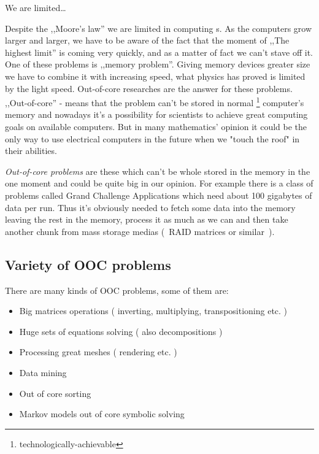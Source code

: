 We are limited\ldots

Despite the ,,Moore's law'' we are limited in computing s.
As the computers grow larger and larger, we have to be aware of the fact that the moment of ,,The highest limit'' is coming very quickly, and as a matter of fact we can't stave off it.
One of these problems is ,,memory problem''.
Giving memory devices greater size we have to combine it with increasing speed, what physics has proved is limited by the light speed.
Out-of-core researches are the answer for these problems. ,,Out-of-core'' - means that the problem can't be stored in normal \footnote{technologically-achievable} computer's memory and nowadays it's a possibility for scientists to achieve great computing goals on available computers.
But in many mathematics' opinion it could be the only way to use electrical computers in the future when we "touch the roof" in their abilities.

\emph{Out-of-core problems} are these which can't be whole stored in the memory in the one moment and could be quite big in our opinion.
For example there is a class of problems called Grand Challenge Applications which need about 100 gigabytes of data per run.\cite{grandc}
Thus it's obviously needed to fetch some data into the memory leaving the rest in the memory, process it as much as we can and then take another chunk from mass storage medias (~RAID matrices or similar~).

\subsection{Variety of OOC problems}
There are many kinds of OOC problems, some of them are:
\begin{itemize}
	\item{Big matrices operations ( inverting, multiplying, transpositioning etc. )}
	\item{Huge sets of equations solving ( also decompositions ) }
	\item{Processing great meshes ( rendering etc. )}
	\item{Data mining}
	\item{Out of core sorting}
	\item{Markov models out of core symbolic solving}

\end{itemize}
	
